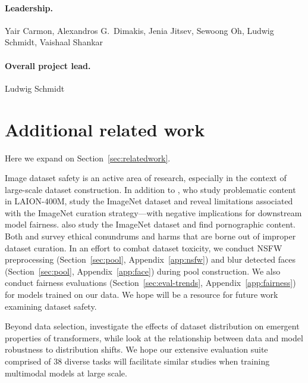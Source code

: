\paragraph{Leadership.}
Yair Carmon, Alexandros G.\ Dimakis, Jenia Jitsev, Sewoong Oh, Ludwig Schmidt, Vaishaal Shankar

\paragraph{Overall project lead.} Ludwig Schmidt


\section{Additional related work}
\label{sec:more-relatedwork}

Here we expand on Section~\ref{sec:relatedwork}.

Image dataset safety is an active area of research, especially in the context of large-scale dataset construction. In addition to \citet{Birhane2021MultimodalDM}, who study problematic content in LAION-400M, \citet{Yang2019TowardsFD} study the ImageNet dataset and reveal limitations associated with the ImageNet curation strategy---with negative implications for downstream model fairness. \citet{Prabhu2020LargeID} also study the ImageNet dataset and find pornographic content. Both \citet{Birhane2021MultimodalDM} and \citet{Prabhu2020LargeID} survey ethical conundrums and harms that are borne out of improper dataset curation. In an effort to combat dataset toxicity, we conduct NSFW preprocessing (Section~\ref{sec:pool}, Appendix~\ref{app:nsfw}) and blur detected faces (Section~\ref{sec:pool}, Appendix~\ref{app:face}) during pool construction. We also conduct fairness evaluations (Section~\ref{sec:eval-trends}, Appendix~\ref{app:fairness}) for models trained on our data. We hope \pool will be a resource for future work examining dataset safety.

Beyond data selection, \citet{chan2022data} investigate the effects of dataset distribution on emergent properties of transformers, while \citet{fang2022data} look at the relationship between data and model robustness to distribution shifts. We hope our extensive evaluation suite comprised of 38 diverse tasks will facilitate similar studies when training multimodal models at large scale.

